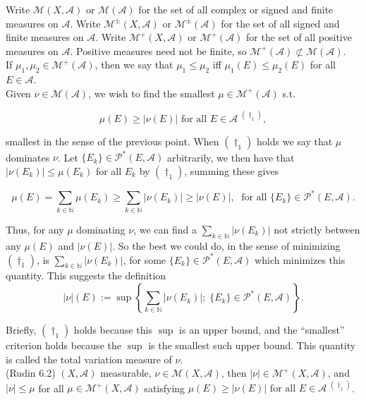 \documentclass[12pt]{article}
\newcommand{\partset}[1]{ \mathcal{P}^{*}(#1) }
\newcommand{\fall}[0] { \textrm{ for all } }
\newcommand{\nats}[0] { \mathbb{N}}
\newcommand{\A}[0] { \mathcal{A} }
\newcommand{\M}[0] { \mathcal{M} }
\begin{document}
Write $\M(X,\A)$ or $\M(\A)$ for the set of all complex or signed and finite measures on $\A$.
Write $\M^\pm(X,\A)$ or $\M^\pm(\A)$ for the set of all signed and finite measures on $\A$.
Write $\M^+(X,\A)$ or $\M^+(\A)$ for the set of all positive measures on $\A$. 
Positive measures need not be finite, so $\M^+(\A) \not \subset \M(\A)$.
\\



If $\mu_1,\mu_2 \in \M^+(\A)$, then we say that $\mu_1 \le \mu_2$ iff $\mu_1(E) \le \mu_2(E)$ for all $E \in \A$.\\

Given $\nu \in \M(\A)$, we wish to find the smallest $\mu \in \M^+(\A)$ s.t.

$$
     \mu(E)  \ge |\nu(E)| \fall E \in \A  \; {}^{(\dagger_1)},
$$

\noindent
smallest in the sense of the previous point. When ${(\dagger_1)}$ holds we say that $\mu$ dominates $\nu$.  Let $\{ E_k \} \in \partset{E,\A}$ arbitrarily, we then have that $|\nu(E_k)| \le \mu(E_k)$ for all $E_k$ by ${(\dagger_1)}$, summing these gives 

$$
\mu(E) = \sum_{k \in \nats} \mu(E_k) \ge \sum_{k \in \nats} |\nu(E_k)| \ge | \nu(E)|, \; \fall \{ E_k\} \in \partset{E, \A}.
$$

\noindent
Thus, for any $\mu$ dominating $\nu$, we can find a $\sum_{k \in \nats} |\nu(E_k)|$ not strictly between any $\mu(E)$ and $|\nu(E)|$. So the best we could do, in the sense of minimizing ${(\dagger_1)}$, is $\sum_{k \in \nats} |\nu(E_k)|$, for some $ \{ E_k\} \in \partset{E, \A}$ which minimizes this quantity. This suggests the definition\\

$$
|\nu|(E) := \sup \left\{  \sum_{k \in \nats} |\nu(E_k)| ; \; \{ E_k\} \in \partset{E, \A}  \right\}.
$$

\noindent   
Briefly, ${(\dagger_1)}$ holds because this $\sup$ is an upper bound, and the ``smallest'' criterion holds because the $\sup$ is the smallest such upper bound. This quantity is called the total variation measure of $\nu$. \\






(Rudin 6.2) $(X, \A)$ measurable, $\nu \in \M(X,\A)$, then $|\nu| \in \M^+(X, \A)$, and $|\nu| \le \mu$ for all $\mu  \in \M^+(X, \A)$ satisfying  $\mu(E)  \ge |\nu(E)| \fall E \in \A \; {}^{(\dagger_1)} $. \\
\end{document}
